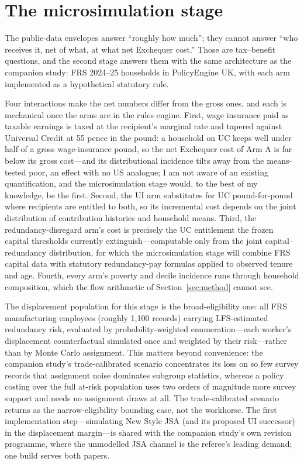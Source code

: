 \section{The microsimulation stage}\label{sec:roadmap}

The public-data envelopes answer ``roughly how much''; they cannot answer
``who receives it, net of what, at what net Exchequer cost.'' Those are
tax--benefit questions, and the second stage answers them with the same
architecture as the companion study: FRS 2024--25 households in
PolicyEngine UK, with each arm implemented as a hypothetical statutory
rule.

Four interactions make the net numbers differ from the gross ones, and
each is mechanical once the arms are in the rules engine. First, wage
insurance paid as taxable earnings is taxed at the recipient's marginal
rate and tapered against Universal Credit at 55 pence in the pound: a
household on UC keeps well under half of a gross wage-insurance pound, so
the net Exchequer cost of Arm A is far below its gross cost---and its
distributional incidence tilts away from the means-tested poor, an effect
with no US analogue; I am not aware of an existing quantification, and
the microsimulation stage would, to the best of my knowledge, be the
first. Second, the UI arm substitutes for UC pound-for-pound where
recipients are entitled to both, so its incremental cost depends on the
joint distribution of contribution histories and household means. Third,
the redundancy-disregard arm's cost is precisely the UC entitlement the
frozen capital thresholds currently extinguish---computable only from the
joint capital--redundancy distribution, for which the microsimulation
stage will combine FRS capital data with statutory redundancy-pay
formulas applied to observed tenure and age. Fourth, every arm's poverty
and decile incidence runs through household composition, which the flow
arithmetic of Section~\ref{sec:method} cannot see.

The displacement population for this stage is the broad-eligibility one:
all FRS manufacturing employees (roughly 1,100 records) carrying
LFS-estimated redundancy risk, evaluated by probability-weighted
enumeration---each worker's displacement counterfactual simulated once
and weighted by their risk---rather than by Monte Carlo assignment. This
matters beyond convenience: the companion study's trade-calibrated
scenario concentrates its loss on so few survey records that assignment
noise dominates subgroup statistics, whereas a policy costing over the
full at-risk population uses two orders of magnitude more survey support
and needs no assignment draws at all. The trade-calibrated scenario
returns as the narrow-eligibility bounding case, not the workhorse. The
first implementation step---simulating New Style JSA (and its proposed UI
successor) in the displacement margin---is shared with the companion
study's own revision programme, where the unmodelled JSA channel is the
referee's leading demand; one build serves both papers.

